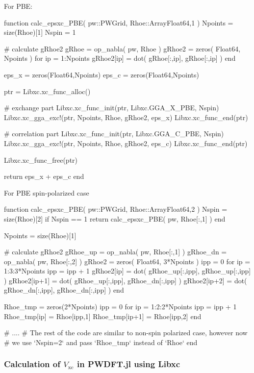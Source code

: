 For PBE:
\begin{juliacode}
function calc_epsxc_PBE( pw::PWGrid, Rhoe::Array{Float64,1} )
    Npoints = size(Rhoe)[1]
    Nspin = 1

    # calculate gRhoe2
    gRhoe = op_nabla( pw, Rhoe )
    gRhoe2 = zeros( Float64, Npoints )
    for ip = 1:Npoints
        gRhoe2[ip] = dot( gRhoe[:,ip], gRhoe[:,ip] )
    end

    eps_x = zeros(Float64,Npoints)
    eps_c = zeros(Float64,Npoints)

    ptr = Libxc.xc_func_alloc()

    # exchange part
    Libxc.xc_func_init(ptr, Libxc.GGA_X_PBE, Nspin)
    Libxc.xc_gga_exc!(ptr, Npoints, Rhoe, gRhoe2, eps_x)
    Libxc.xc_func_end(ptr)

    # correlation part
    Libxc.xc_func_init(ptr, Libxc.GGA_C_PBE, Nspin)
    Libxc.xc_gga_exc!(ptr, Npoints, Rhoe, gRhoe2, eps_c)
    Libxc.xc_func_end(ptr)

    Libxc.xc_func_free(ptr)

    return eps_x + eps_c
end
\end{juliacode}

For PBE spin-polarized case

\begin{juliacode}
function calc_epsxc_PBE( pw::PWGrid, Rhoe::Array{Float64,2} )
    Nspin = size(Rhoe)[2]
    if Nspin == 1
        return calc_epsxc_PBE( pw, Rhoe[:,1] )
    end

    Npoints = size(Rhoe)[1]

    # calculate gRhoe2
    gRhoe_up = op_nabla( pw, Rhoe[:,1] )
    gRhoe_dn = op_nabla( pw, Rhoe[:,2] )
    gRhoe2 = zeros( Float64, 3*Npoints )
    ipp = 0
    for ip = 1:3:3*Npoints
        ipp = ipp + 1
        gRhoe2[ip]   = dot( gRhoe_up[:,ipp], gRhoe_up[:,ipp] )
        gRhoe2[ip+1] = dot( gRhoe_up[:,ipp], gRhoe_dn[:,ipp] )
        gRhoe2[ip+2] = dot( gRhoe_dn[:,ipp], gRhoe_dn[:,ipp] )
    end

    Rhoe_tmp = zeros(2*Npoints)
    ipp = 0
    for ip = 1:2:2*Npoints
        ipp = ipp + 1
        Rhoe_tmp[ip] = Rhoe[ipp,1]
        Rhoe_tmp[ip+1] = Rhoe[ipp,2]
    end

    # ....
    # The rest of the code are similar to non-spin polarized case, however now
    # we use `Nspin=2` and pass `Rhoe_tmp` instead of `Rhoe`
end
\end{juliacode}


\subsubsection{Calculation of $V_{\mathrm{xc}}$ in \textsf{PWDFT.jl} using Libxc}


